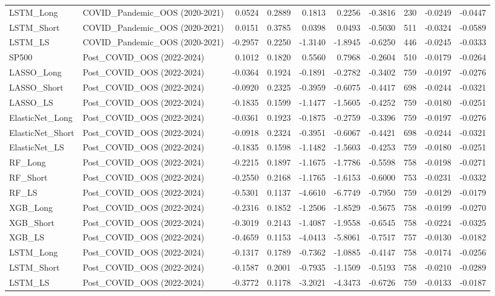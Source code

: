 \begin{tabular}{llrrrrrrrr}
\cline{1-10}
LSTM\_Long & COVID\_Pandemic\_OOS (2020-2021) & 0.0524 & 0.2889 & 0.1813 & 0.2256 & -0.3816 & 230 & -0.0249 & -0.0447 \\
\cline{1-10}
LSTM\_Short & COVID\_Pandemic\_OOS (2020-2021) & 0.0151 & 0.3785 & 0.0398 & 0.0493 & -0.5030 & 511 & -0.0324 & -0.0589 \\
\cline{1-10}
LSTM\_LS & COVID\_Pandemic\_OOS (2020-2021) & -0.2957 & 0.2250 & -1.3140 & -1.8945 & -0.6250 & 446 & -0.0245 & -0.0333 \\
\cline{1-10}
SP500 & Post\_COVID\_OOS (2022-2024) & 0.1012 & 0.1820 & 0.5560 & 0.7968 & -0.2604 & 510 & -0.0179 & -0.0264 \\
\cline{1-10}
LASSO\_Long & Post\_COVID\_OOS (2022-2024) & -0.0364 & 0.1924 & -0.1891 & -0.2782 & -0.3402 & 759 & -0.0197 & -0.0276 \\
\cline{1-10}
LASSO\_Short & Post\_COVID\_OOS (2022-2024) & -0.0920 & 0.2325 & -0.3959 & -0.6075 & -0.4417 & 698 & -0.0244 & -0.0321 \\
\cline{1-10}
LASSO\_LS & Post\_COVID\_OOS (2022-2024) & -0.1835 & 0.1599 & -1.1477 & -1.5605 & -0.4252 & 759 & -0.0180 & -0.0251 \\
\cline{1-10}
ElasticNet\_Long & Post\_COVID\_OOS (2022-2024) & -0.0361 & 0.1923 & -0.1875 & -0.2759 & -0.3396 & 759 & -0.0197 & -0.0276 \\
\cline{1-10}
ElasticNet\_Short & Post\_COVID\_OOS (2022-2024) & -0.0918 & 0.2324 & -0.3951 & -0.6067 & -0.4421 & 698 & -0.0244 & -0.0321 \\
\cline{1-10}
ElasticNet\_LS & Post\_COVID\_OOS (2022-2024) & -0.1835 & 0.1598 & -1.1482 & -1.5603 & -0.4253 & 759 & -0.0180 & -0.0251 \\
\cline{1-10}
RF\_Long & Post\_COVID\_OOS (2022-2024) & -0.2215 & 0.1897 & -1.1675 & -1.7786 & -0.5598 & 758 & -0.0198 & -0.0271 \\
\cline{1-10}
RF\_Short & Post\_COVID\_OOS (2022-2024) & -0.2550 & 0.2168 & -1.1765 & -1.6153 & -0.6000 & 753 & -0.0231 & -0.0332 \\
\cline{1-10}
RF\_LS & Post\_COVID\_OOS (2022-2024) & -0.5301 & 0.1137 & -4.6610 & -6.7749 & -0.7950 & 759 & -0.0129 & -0.0179 \\
\cline{1-10}
XGB\_Long & Post\_COVID\_OOS (2022-2024) & -0.2316 & 0.1852 & -1.2506 & -1.8529 & -0.5675 & 758 & -0.0199 & -0.0270 \\
\cline{1-10}
XGB\_Short & Post\_COVID\_OOS (2022-2024) & -0.3019 & 0.2143 & -1.4087 & -1.9558 & -0.6545 & 758 & -0.0224 & -0.0325 \\
\cline{1-10}
XGB\_LS & Post\_COVID\_OOS (2022-2024) & -0.4659 & 0.1153 & -4.0413 & -5.8061 & -0.7517 & 757 & -0.0130 & -0.0182 \\
\cline{1-10}
LSTM\_Long & Post\_COVID\_OOS (2022-2024) & -0.1317 & 0.1789 & -0.7362 & -1.0885 & -0.4147 & 758 & -0.0174 & -0.0256 \\
\cline{1-10}
LSTM\_Short & Post\_COVID\_OOS (2022-2024) & -0.1587 & 0.2001 & -0.7935 & -1.1509 & -0.5193 & 758 & -0.0210 & -0.0289 \\
\cline{1-10}
LSTM\_LS & Post\_COVID\_OOS (2022-2024) & -0.3772 & 0.1178 & -3.2021 & -4.3473 & -0.6726 & 759 & -0.0133 & -0.0187 \\
\cline{1-10}
\bottomrule
\end{tabular}
